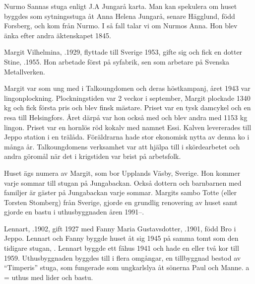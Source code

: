
\jhnooccupant{}

Nurmo Sannas stuga enligt J.A Jungarå karta. Man kan spekulera om huset byggdes som sytningsstuga åt Anna Helena Jungarå, senare Hägglund, född Forsberg, och kom från Nurmo. I så fall talar vi om Nurmos Anna. Hon blev änka efter andra äktenskapet 1845.






Margit Vilhelmina, .1929, flyttade till Sverige 1953, gifte sig och fick en dotter Stine, .1955. Hon arbetade först på syfabrik, sen som arbetare på Svenska Metallverken.

Margit var som ung med i Talkoungdomen och deras höstkampanj, året 1943 var lingonplockning. Plockningstiden var 2 veckor i september, Margit plockade 1340 kg och fick första pris och blev finsk mästare. Priset var en tysk damcykel och en resa till Helsingfors. Året därpå var hon också med och blev andra med 1153 kg lingon. Priset var en hornlös röd kokalv med namnet Essi. Kalven levererades till Jeppo station i en trälåda. Föräldrarna hade stor ekonomisk nytta av denna ko i många år. Talkoungdomens verksamhet var att hjälpa till i skördearbetet och andra göromål när det i krigstiden var brist på arbetsfolk.

Huset ägs numera av Margit, som bor Upplands Väsby, Sverige. Hon kommer varje sommar till stugan på Jungabackan. Också dottern och barnbarnen med familjer är gäster på Jungabackan varje sommar. Margits sambo Totte (eller Torsten Stomberg)  från Sverige, gjorde en grundlig renovering av huset samt gjorde en bastu i uthusbyggnaden åren 1991--.



Lennart, .1902, gift 1927 med Fanny Maria Gustavsdotter, .1901, född Bro i Jeppo. Lennart och Fanny byggde huset åt sig 1945 på samma tomt som den tidigare stugan, . Lennart byggde ett fähus 1941 och hade en eller två kor till 1959. Uthusbyggnaden byggdes till i flera omgångar, en tillbyggnad bestod av ``Timperis'' stuga, som fungerade som ungkarlslya åt sönerna Paul och Manne. a = uthus med lider och bastu.

